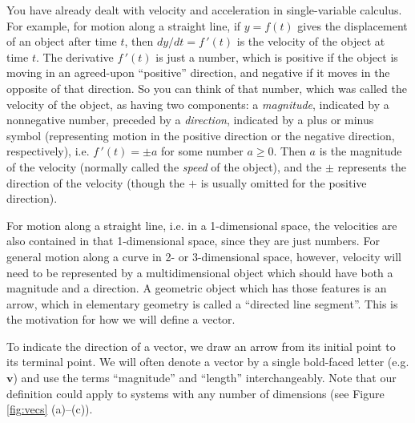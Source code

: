 You have already dealt with velocity and acceleration in single-variable calculus.  For example, for motion along a
straight line, if $y = f(t)$ gives the displacement of an object after time $t$, then $dy/dt = f\,'(t)$ is the velocity
of the object at time $t$.  The derivative
$f\,'(t)$ is just a number, which is positive if the object is moving in an
agreed-upon ``positive'' direction, and negative if it moves in the opposite of that direction. So you can think of
that number, which was called the velocity of the object, as having two components: a \emph{magnitude}, indicated by
a nonnegative number, preceded by a \emph{direction}, indicated by a plus or minus symbol (representing motion in the
positive direction or the negative direction, respectively), i.e. $f\,'(t) = \pm a$ for some number $a \ge 0$.  Then
$a$ is the magnitude of the velocity (normally called the \emph{speed} of the object), and the $\pm$ represents the
direction of the velocity (though the $+$ is usually omitted for the positive direction).

For motion along a straight line, i.e. in a 1-dimensional space, the velocities are also contained in that 1-dimensional space, since they are just numbers.  
For general motion along a curve in 2- or 3-dimensional space,
however, velocity will need to be represented by a multidimensional object which should have both a magnitude and a
direction.  
A geometric object which has those features is an arrow, which in elementary geometry is called a
``directed line segment''.  This is the motivation for how we will define a vector.


To indicate the direction of a vector, we draw an arrow from its initial point to its terminal
point. We will often denote a vector by a single bold-faced letter (e.g. $\mathbf{v}$) and use the terms
``magnitude'' and ``length'' interchangeably.
Note that our definition could apply to systems with any number of dimensions (see Figure \ref{fig:vecs}
(a)--(c)).

